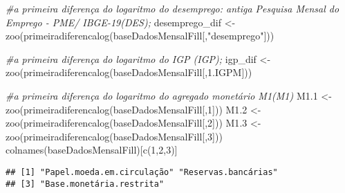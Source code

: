 \documentclass[
]{article}
\newenvironment{Shaded}{\begin{snugshade}}{\end{snugshade}}
\newcommand{\CommentTok}[1]{\textcolor[rgb]{0.56,0.35,0.01}{\textit{#1}}}
\newcommand{\DecValTok}[1]{\textcolor[rgb]{0.00,0.00,0.81}{#1}}
\newcommand{\FloatTok}[1]{\textcolor[rgb]{0.00,0.00,0.81}{#1}}
\newcommand{\FunctionTok}[1]{\textcolor[rgb]{0.00,0.00,0.00}{#1}}
\newcommand{\NormalTok}[1]{#1}
\newcommand{\OtherTok}[1]{\textcolor[rgb]{0.56,0.35,0.01}{#1}}
\newcommand{\StringTok}[1]{\textcolor[rgb]{0.31,0.60,0.02}{#1}}
\begin{document}
\begin{Shaded}
\begin{Highlighting}[]
\CommentTok{\#a primeira diferença do logaritmo do desemprego: antiga Pesquisa Mensal do Emprego {-} PME/ IBGE{-}19(DES);}
\NormalTok{desemprego\_dif }\OtherTok{\textless{}{-}} \FunctionTok{zoo}\NormalTok{(}\FunctionTok{primeiradiferencalog}\NormalTok{(baseDadosMensalFill[,}\StringTok{"desemprego"}\NormalTok{]))}

\CommentTok{\#a primeira diferença do logaritmo do IGP (IGP);}
\NormalTok{igp\_dif }\OtherTok{\textless{}{-}} \FunctionTok{zoo}\NormalTok{(}\FunctionTok{primeiradiferencalog}\NormalTok{(baseDadosMensalFill[,}\StringTok{\textquotesingle{}1.IGPM\textquotesingle{}}\NormalTok{]))}

\CommentTok{\#a primeira diferença do logaritmo do agregado monetário M1(M1)}
\NormalTok{M1}\FloatTok{.1} \OtherTok{\textless{}{-}} \FunctionTok{zoo}\NormalTok{(}\FunctionTok{primeiradiferencalog}\NormalTok{(baseDadosMensalFill[,}\DecValTok{1}\NormalTok{]))}
\NormalTok{M1}\FloatTok{.2} \OtherTok{\textless{}{-}} \FunctionTok{zoo}\NormalTok{(}\FunctionTok{primeiradiferencalog}\NormalTok{(baseDadosMensalFill[,}\DecValTok{2}\NormalTok{]))}
\NormalTok{M1}\FloatTok{.3} \OtherTok{\textless{}{-}} \FunctionTok{zoo}\NormalTok{(}\FunctionTok{primeiradiferencalog}\NormalTok{(baseDadosMensalFill[,}\DecValTok{3}\NormalTok{]))}
\FunctionTok{colnames}\NormalTok{(baseDadosMensalFill)[}\FunctionTok{c}\NormalTok{(}\DecValTok{1}\NormalTok{,}\DecValTok{2}\NormalTok{,}\DecValTok{3}\NormalTok{)]}
\end{Highlighting}
\end{Shaded}

\begin{verbatim}
## [1] "Papel.moeda.em.circulação" "Reservas.bancárias"       
## [3] "Base.monetária.restrita"
\end{verbatim}
\end{document}
